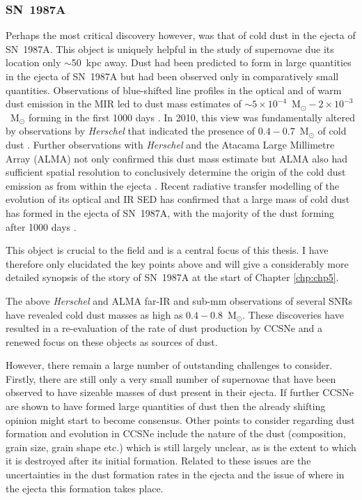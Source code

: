  \subsubsection{SN~1987A}
 
 Perhaps the most critical discovery however, was that of cold dust in the ejecta of SN~1987A.  This object is uniquely helpful in the study of supernovae due its location only $\sim$50~kpc away.  Dust had been predicted to form in large quantities in the ejecta of SN~1987A \citep{Dwek1988} but had been observed only in comparatively small quantities.  Observations of blue-shifted line profiles in the optical and of warm dust emission in the MIR led to dust mass estimates of $\sim5\times 10^{-4}$~M$_{\odot} - 2 \times 10^{-3}$~M$_{\odot}$ forming in the first 1000 days \citep{Lucy1989,Roche1989,Bouchet1991,Wooden1993,Ercolano2007}.  In 2010, this view was fundamentally altered by observations by \textit{Herschel} that indicated the presence of $0.4-0.7$~M$_{\odot}$ of cold dust \citep{Matsuura2011}.  Further observations with {\em Herschel} and the Atacama Large Millimetre Array (ALMA) not only confirmed this dust mass estimate but ALMA also had sufficient spatial resolution to conclusively determine the origin of the cold dust emission as from within the ejecta \citep{Indebetouw2014,Matsuura2015}.  Recent radiative transfer modelling of the evolution of its optical and IR SED has confirmed that a large  mass of cold dust has formed in the ejecta of SN~1987A, with the majority of the dust forming after 1000 days \citep{Wesson2015}.
 
 This object is crucial to the field and is a central focus of this thesis.  I have therefore only elucidated the key points above and will give a considerably more detailed synopsis of the story of SN~1987A at the start of Chapter \ref{chp:chp5}.
 
\vspace{3ex}
\noindent The above {\em Herschel} and ALMA far-IR and sub-mm observations of several SNRs have revealed cold dust masses as high as $0.4-0.8$~M$_{\odot}$.  These discoveries have resulted in a re-evaluation of the rate of dust production by CCSNe and a renewed focus on these objects as sources of dust.

However, there remain a large number of outstanding challenges to consider.  Firstly, there are still only a very small number of supernovae that have been observed to have sizeable masses of dust present in their ejecta.  If further CCSNe are shown to have formed large quantities of dust then the already shifting opinion might start to become consensus.  Other points to consider regarding dust formation and evolution in CCSNe include the nature of the dust (composition, grain size, grain shape etc.) which is still largely unclear, as is the extent to which it is destroyed after its initial formation.  Related to these issues are the uncertainties in the dust formation rates in the ejecta and the issue of where in the ejecta this formation takes place.  

